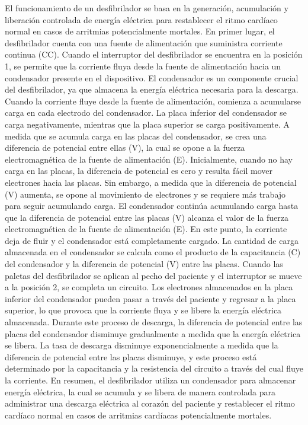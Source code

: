 El funcionamiento de un desfibrilador se basa en la generación, acumulación y liberación controlada de energía eléctrica para restablecer el ritmo cardíaco normal en casos de arritmias potencialmente mortales.\newline \hfill \break
En primer lugar, el desfibrilador cuenta con una fuente de alimentación que suministra corriente continua (CC). Cuando el interruptor del desfibrilador se encuentra en la posición 1, se permite que la corriente fluya desde la fuente de alimentación hacia un condensador presente en el dispositivo.\newline \hfill \break
El condensador es un componente crucial del desfibrilador, ya que almacena la energía eléctrica necesaria para la descarga. Cuando la corriente fluye desde la fuente de alimentación, comienza a acumularse carga en cada electrodo del condensador. La placa inferior del condensador se carga negativamente, mientras que la placa superior se carga positivamente.\newline \hfill \break
A medida que se acumula carga en las placas del condensador, se crea una diferencia de potencial entre ellas (V), la cual se opone a la fuerza electromagnética de la fuente de alimentación (E). Inicialmente, cuando no hay carga en las placas, la diferencia de potencial es cero y resulta fácil mover electrones hacia las placas. Sin embargo, a medida que la diferencia de potencial (V) aumenta, se opone al movimiento de electrones y se requiere más trabajo para seguir acumulando carga.\newline \hfill \break
El condensador continúa acumulando carga hasta que la diferencia de potencial entre las placas (V) alcanza el valor de la fuerza electromagnética de la fuente de alimentación (E). En este punto, la corriente deja de fluir y el condensador está completamente cargado. La cantidad de carga almacenada en el condensador se calcula como el producto de la capacitancia (C) del condensador y la diferencia de potencial (V) entre las placas.\newline \hfill \break
Cuando las paletas del desfibrilador se aplican al pecho del paciente y el interruptor se mueve a la posición 2, se completa un circuito. Los electrones almacenados en la placa inferior del condensador pueden pasar a través del paciente y regresar a la placa superior, lo que provoca que la corriente fluya y se libere la energía eléctrica almacenada.\newline \hfill \break
Durante este proceso de descarga, la diferencia de potencial entre las placas del condensador disminuye gradualmente a medida que la energía eléctrica se libera. La tasa de descarga disminuye exponencialmente a medida que la diferencia de potencial entre las placas disminuye, y este proceso está determinado por la capacitancia y la resistencia del circuito a través del cual fluye la corriente.\newline \hfill \break
En resumen, el desfibrilador utiliza un condensador para almacenar energía eléctrica, la cual se acumula y se libera de manera controlada para administrar una descarga eléctrica al corazón del paciente y restablecer el ritmo cardíaco normal en casos de arritmias cardíacas potencialmente mortales.

